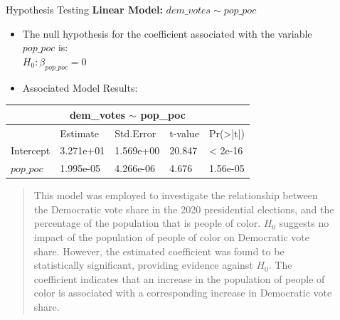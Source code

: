 \documentclass[xcolor=dvipsnames]{beamer}
\newlength{\sepwid}
\newlength{\onecolwid}
\newlength{\twocolwid}
\begin{document}
\begin{frame}[t]
\begin{columns}[t]
\begin{column}{\onecolwid}

\begin{block}{Hypothesis Testing}
\textbf{Linear Model: } \newline
$dem\_votes \sim pop\_poc$ 
\begin{itemize}
\item [\textcolor{black}{\textbullet}] The null hypothesis for the coefficient associated with the variable $pop\_poc$ is: \\
$H_0: \beta_{pop\_poc} = 0$
\item [\textcolor{black}{\textbullet}] Associated Model Results:
\end{itemize}


\begin{tabular}{ |p{5.4cm}|p{5.5cm}|p{5cm}|p{4.5cm}|p{5cm}|}

 \hline
 \multicolumn{5}{|c|}{dem\_votes $\sim$ pop\_poc} \\
 \hline
 & Estimate &Std.Error &t-value & Pr(>|t|)\\
 \hline
 Intercept   & 3.271e+01    &1.569e+00&  20.847 & < 2e-16\\
 \hline
 $pop\_poc$ &  1.995e-05  & 4.266e-06  &4.676 & 1.56e-05\\
 \hline
\end{tabular}

\begin{quote}
\textcolor{white}{\textbullet}This model was employed to investigate the relationship between the Democratic vote share in the 2020 presidential elections, and the percentage of the population that is people of color. $H_0$ suggests no impact of the population of people of color on Democratic vote share. However, the estimated coefficient was found to be statistically significant, providing evidence against $H_0$. The coefficient indicates that an increase in the population of people of color is associated with a corresponding increase in Democratic vote share.
\end{quote}
\end{block}


\end{column} %
\begin{column}{\sepwid}\end{column} %
\begin{column}{\twocolwid} %
\begin{columns}[t,totalwidth=\twocolwid] %
\begin{column}{\onecolwid}\vspace{-.6in} %


\end{column}
\end{columns}
\end{column}
\end{columns}
\end{frame}
\end{document}
